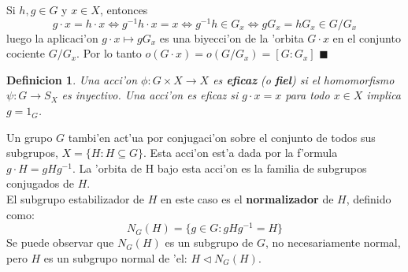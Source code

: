 \documentclass[a4paper,openright,12pt]{book}
\numberwithin{equation}{section} %
\newtheorem{definicion}{Definicion}[section] %
\newenvironment{proof}{\noindent{\it Demostracion:}}{\hfill$\blacksquare$} %
\begin{document}
\begin{proof}
Si $h,g \in G$ y $x \in X$, entonces
\[
g \cdot x = h \cdot x \Longleftrightarrow g^{-1}h \cdot x = x \Longleftrightarrow g^{-1}h \in G_{x} \Longleftrightarrow gG_{x} = hG_{x} \in G/G_{x}
\]
luego la aplicaci'on $g \cdot x \mapsto gG_{x}$ es una biyecci'on de la 'orbita $G \cdot x$ en el conjunto cociente $G/G_{x}$. Por lo tanto $o(G \cdot x)=o(G/G_ {x})=[G:G_{x}]$
\end{proof}
\begin{definicion}
Una acci'on $\phi : G \times X \rightarrow X$ es \textbf{eficaz} (o \textbf{fiel}) si el homomorfismo $\psi : G \rightarrow S_{X}$ es inyectivo. Una acci'on es eficaz si $g \cdot x=x$ para todo $x \in X$ implica $g=1_{G}$.
\end{definicion}
Un grupo $G$ tambi'en act'ua por conjugaci'on sobre el conjunto de todos sus subgrupos, $X=\{H:H\subseteq G \}$. Esta acci'on est'a dada por la f'ormula $g \cdot H = gHg^{-1} $. La 'orbita de H bajo esta acci'on es la familia de subgrupos conjugados de $H$. \\
El subgrupo estabilizador de $H$ en este caso es el \textbf{normalizador} de $H$, definido como:
\[
N_{G}(H)=\{g \in G : gHg^{-1}=H  \}
\]
Se puede observar que $N_{G}(H)$ es un subgrupo de $G$, no necesariamente normal, pero $H$ es un subgrupo normal de 'el: $H \triangleleft N_{G}(H)$.
\end{document}
